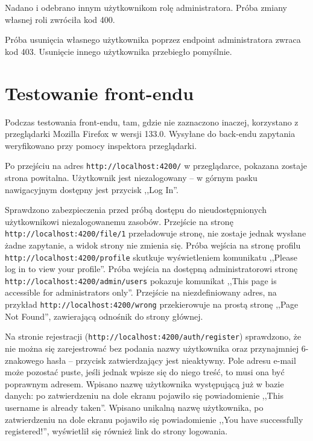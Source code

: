 \documentclass[a4paper,twoside,12pt]{book}
\begin{document}
Nadano i odebrano innym użytkownikom rolę administratora. Próba zmiany własnej roli zwróciła kod 400.

Próba usunięcia własnego użytkownika poprzez endpoint administratora zwraca kod 403. Usunięcie innego użytkownika przebiegło pomyślnie.

\section{Testowanie front-endu}

Podczas testowania front-endu, tam, gdzie nie zaznaczono inaczej, korzystano z przeglądarki Mozilla Firefox w wersji 133.0. Wysyłane do back-endu zapytania weryfikowano przy pomocy inspektora przeglądarki.

Po przejściu na adres \texttt{http://localhost:4200/} w przeglądarce, pokazana zostaje strona powitalna. Użytkownik jest niezalogowany -- w górnym pasku nawigacyjnym dostępny jest przycisk ,,Log In''. 

Sprawdzono zabezpieczenia przed próbą dostępu do nieudostępnionych użytkownikowi niezalogowanemu zasobów. Przejście na stronę \texttt{http://localhost:4200/file/1} przeładowuje stronę, nie zostaje jednak wysłane żadne zapytanie, a widok strony nie zmienia się. Próba wejścia na stronę profilu \texttt{http://localhost:4200/profile} skutkuje wyświetleniem komunikatu ,,Please log in to view your profile''. Próba wejścia na dostępną administratorowi stronę \texttt{http://localhost:4200/admin/users} pokazuje komunikat ,,This page is accessible for administrators only''. Przejście na niezdefiniowany adres, na przykład \texttt{http://localhost:4200/wrong} przekierowuje na prostą stronę ,,Page Not Found'', zawierającą odnośnik do strony głównej. 

Na stronie rejestracji (\texttt{http://localhost:4200/auth/register}) sprawdzono, że nie można się zarejestrować bez podania nazwy użytkownika oraz przynajmniej 6-znakowego hasła -- przycisk zatwierdzający jest nieaktywny. Pole adresu e-mail może pozostać puste, jeśli jednak wpisze się do niego treść, to musi ona być poprawnym adresem. Wpisano nazwę użytkownika występującą już w bazie danych: po zatwierdzeniu na dole ekranu pojawiło się powiadomienie ,,This username is already taken''. Wpisano unikalną nazwę użytkownika, po zatwierdzeniu na dole ekranu pojawiło się powiadomienie ,,You have successfully registered!'', wyświetlił się również link do strony logowania.
\end{document}
